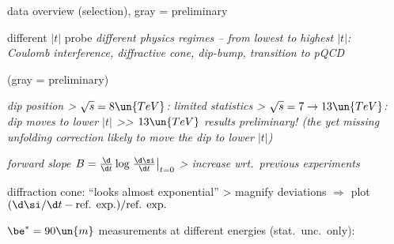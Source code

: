 \> data overview (selection), \cBlack gray = preliminary

\centerline{}

\> different $|t|$ probe \em{different physics regimes} -- from lowest to highest $|t|$:
\\ \cThird Coulomb interference, diffractive cone, dip-bump, transition to pQCD


\newpage %

\centerline{\cBlack (gray = preliminary)}

\centerline{%
	\hskip5mm
}

\> \em{dip position}
\>> $\sqrt s = 8\un{TeV}$: limited statistics
\>> $\sqrt s = 7 \rightarrow 13\un{TeV}$: dip moves to lower $|t|$
\>>> $13\un{TeV}$ results preliminary! (the yet missing unfolding correction likely to move the dip to lower $|t|$)

\> \em{forward slope} $B = {\d\over\d t} \log \left.{\d\si\over\d t} \right |_{t=0}$
\>> increase wrt.~previous experiments

\newpage %

\> diffraction cone: ``looks almost exponential''
\>> magnify deviations $\Rightarrow$ plot \cThird ${(\d\si/\d t - \hbox{ref. exp.}) / \hbox{ref. exp.}}$

\> $\be^* = 90\un{m}$ measurements at different energies (stat.~unc.~only):

\centerline{%
	\hskip-1mm
	\hskip-1mm
}

\vskip-3mm



